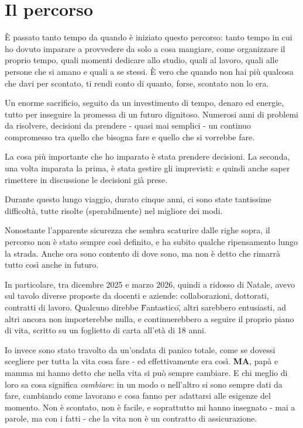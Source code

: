 
\chapter*{Il percorso}
È passato tanto tempo da quando è iniziato questo percorso: tanto tempo in cui ho dovuto imparare a provvedere da solo a cosa mangiare, come organizzare il proprio tempo, quali momenti dedicare allo studio, quali al lavoro, quali alle persone che si amano e quali a se stessi.
È vero che quando non hai più qualcosa che davi per scontato, ti rendi conto di quanto, forse, scontato non lo era.

Un enorme sacrificio, seguito da un investimento di tempo, denaro ed energie, tutto per inseguire la promessa di un futuro dignitoso.
Numerosi anni di problemi da risolvere, decisioni da prendere - quasi mai semplici - un continuo compromesso tra quello che bisogna fare e quello che si vorrebbe fare.

La cosa più importante che ho imparato è stata prendere decisioni.
La seconda, una volta imparata la prima, è stata gestire gli imprevisti: e quindi anche saper rimettere in discussione le decisioni già prese.

Durante questo lungo viaggio, durato cinque anni, ci sono state tantissime difficoltà, tutte risolte (sperabilmente) nel migliore dei modi.

Nonostante l'apparente sicurezza che sembra scaturire dalle righe sopra, il percorso non è stato sempre così definito, e ha subito qualche ripensamento lungo la strada.
Anche ora sono contento di dove sono, ma non è detto che rimarrà tutto così anche in futuro.

In particolare, tra dicembre 2025 e marzo 2026, quindi a ridosso di Natale, avevo sul tavolo diverse proposte da docenti e aziende: collaborazioni, dottorati, contratti di lavoro.
Qualcuno direbbe \"Fantastico\", altri sarebbero entusiasti, ad altri ancora non importerebbe nulla, e continuerebbero a seguire il proprio piano di vita, scritto su un foglietto di carta all'età di 18 anni.

Io invece sono stato travolto da un'ondata di panico totale, come se dovessi scegliere per tutta la vita cosa fare - ed effettivamente era così. \textbf{MA}, papà e mamma mi hanno detto che nella vita si può sempre cambiare. E chi meglio di loro sa cosa significa \textit{cambiare}: in un modo o nell'altro si sono sempre dati da fare, cambiando come lavorano e cosa fanno per adattarsi alle esigenze del momento. Non è scontato, non è facile, e soprattutto mi hanno insegnato - mai a parole, ma con i fatti - che la vita non è un contratto di assicurazione.


